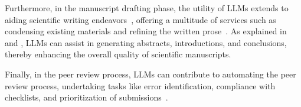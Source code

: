 Furthermore, in the manuscript drafting phase, the utility of LLMs extends to aiding scientific writing endeavors~\cite{alkaissi2023artificialhallucinations, azaria2023chatgptexperts}, offering a multitude of services such as condensing existing materials and refining the written prose~\cite{buruk2023academicwriting}.
As explained in \textcite{buruk2023academicwriting} and \textcite{alkaissi2023artificialhallucinations}, LLMs can assist in generating abstracts, introductions, and conclusions, thereby enhancing the overall quality of scientific manuscripts.

Finally, in the peer review process, LLMs can contribute to automating the peer review process, undertaking tasks like error identification, compliance with checklists, and prioritization of submissions~\cite{liu2023reviewergpt}.

